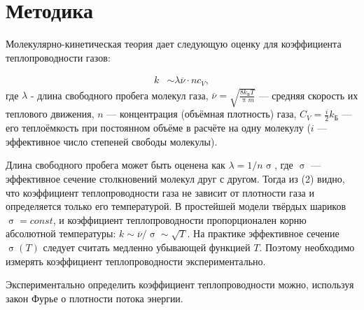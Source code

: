 \chapter{Методика}
\label{ch:methods}

    Молекулярно-кинетическая теория дает следующую оценку для коэффициента теплопроводности газов:

    \begin{align}
        k &\sim \lambda \overline{\nu} \cdot n c_V \label{k},
    \end{align}
    где $\lambda$ - длина свободного пробега молекул газа, $\overline{\nu} = \sqrt{\frac{8k_{\text{Б}}T}{\uppi m}}$ — средняя скорость их теплового движения, $n$ — концентрация (объёмная плотность) газа, $C_V = \frac{i}{2}k_{\text{Б}}$ — его теплоёмкость при постоянном объёме в расчёте на одну молекулу ($i$ — эффективное число степеней свободы молекулы).

    Длина свободного пробега может быть оценена как $\lambda = 1/n\upsigma$, где $\upsigma$ — эффективное сечение столкновений молекул друг с другом. Тогда из (2) видно, что коэффициент теплопроводности газа не зависит от плотности газа и определяется только его температурой. В простейшей модели твёрдых шариков $\upsigma = const$, и коэффициент теплопроводности пропорционален корню абсолютной температуры: $k \sim \overline{\nu}/\upsigma \sim \sqrt{T}$. На практике эффективное сечение $\upsigma(T)$ следует считать медленно убывающей функцией $T$. Поэтому необходимо измерять коэффициент теплопроводности экспериментально.

    Экспериментально определить коэффициент теплопроводности можно, используя закон Фурье о плотности потока энергии.
        

   